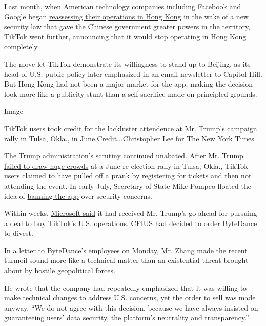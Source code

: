 Last month, when American technology companies including Facebook and
Google began
\href{https://www.nytimes.com/2020/07/07/business/hong-kong-security-law-tech.html}{reassessing
their operations in Hong Kong} in the wake of a new security law that
gave the Chinese government greater powers in the territory, TikTok went
further, announcing that it would stop operating in Hong Kong
completely.

The move let TikTok demonstrate its willingness to stand up to Beijing,
as its head of U.S. public policy later emphasized in an email
newsletter to Capitol Hill. But Hong Kong had not been a major market
for the app, making the decision look more like a publicity stunt than a
self-sacrifice made on principled grounds.

Image

TikTok users took credit for the lackluster attendence at Mr. Trump's
campaign rally in Tulsa, Okla., in June.Credit...Christopher Lee for The
New York Times

The Trump administration's scrutiny continued unabated. After
\href{https://www.nytimes.com/2020/06/21/style/tiktok-trump-rally-tulsa.html}{Mr.
Trump failed to draw huge crowds} at a June re-election rally in Tulsa,
Okla., TikTok users claimed to have pulled off a prank by registering
for tickets and then not attending the event. In early July, Secretary
of State Mike Pompeo floated the idea of
\href{https://www.cnbc.com/2020/07/07/us-looking-at-banning-tiktok-and-chinese-social-media-apps-pompeo.html}{banning
the app} over security concerns.

Within weeks,
\href{https://www.nytimes.com/2020/08/02/business/economy/trump-tiktok-china-national-security.html}{Microsoft
said} it had received Mr. Trump's go-ahead for pursuing a deal to buy
TikTok's U.S. operations.
\href{https://www.nytimes.com/2020/07/31/technology/tiktok-microsoft.html}{CFIUS
had decided} to order ByteDance to divest.

In
\href{https://www.toutiao.com/i6856642212948607502/?timestamp=1596448119\&app=news_article\&group_id=6856642212948607502\&use_new_style=1\&req_id=2020080317483801001404814024245E48}{a
letter to ByteDance's employees} on Monday, Mr. Zhang made the recent
turmoil sound more like a technical matter than an existential threat
brought about by hostile geopolitical forces.

He wrote that the company had repeatedly emphasized that it was willing
to make technical changes to address U.S. concerns, yet the order to
sell was made anyway. ``We do not agree with this decision, because we
have always insisted on guaranteeing users' data security, the
platform's neutrality and transparency.''

